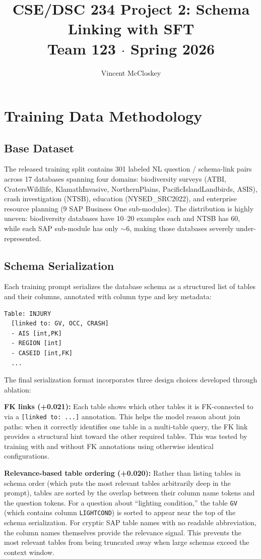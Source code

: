 \documentclass[10pt,twocolumn]{article}
\title{\textbf{CSE/DSC 234 Project 2: Schema Linking with SFT}\\
\large Team 123 $\cdot$ Spring 2026}
\date{}
\author{Vincent McCloskey}
\begin{document}
\maketitle
\thispagestyle{empty}

\section{Training Data Methodology}

\subsection*{Base Dataset}
The released training split contains 301 labeled NL question / schema-link pairs across 17 databases spanning four domains: biodiversity surveys (ATBI, CratersWildlife, KlamathInvasive, NorthernPlains, PacificIslandLandbirds, ASIS), crash investigation (NTSB), education (NYSED\_SRC2022), and enterprise resource planning (9 SAP Business One sub-modules). The distribution is highly uneven: biodiversity databases have 10--20 examples each and NTSB has 60, while each SAP sub-module has only $\sim$6, making those databases severely under-represented.

\subsection*{Schema Serialization}
Each training prompt serializes the database schema as a structured list of tables and their columns, annotated with column type and key metadata:
\begin{verbatim}
Table: INJURY
  [linked to: GV, OCC, CRASH]
  - AIS [int,PK]
  - REGION [int]
  - CASEID [int,FK]
  ...
\end{verbatim}
The final serialization format incorporates three design choices developed through ablation:

\textbf{FK links (+0.021):} Each table shows which other tables it is FK-connected to via a \texttt{[linked to: ...]} annotation. This helps the model reason about join paths: when it correctly identifies one table in a multi-table query, the FK link provides a structural hint toward the other required tables. This was tested by training with and without FK annotations using otherwise identical configurations.

\textbf{Relevance-based table ordering (+0.020):} Rather than listing tables in schema order (which puts the most relevant tables arbitrarily deep in the prompt), tables are sorted by the overlap between their column name tokens and the question tokens. For a question about ``lighting condition,'' the table \texttt{GV} (which contains column \texttt{LIGHTCOND}) is sorted to appear near the top of the schema serialization. For cryptic SAP table names with no readable abbreviation, the column names themselves provide the relevance signal. This prevents the most relevant tables from being truncated away when large schemas exceed the context window.
\end{document}
